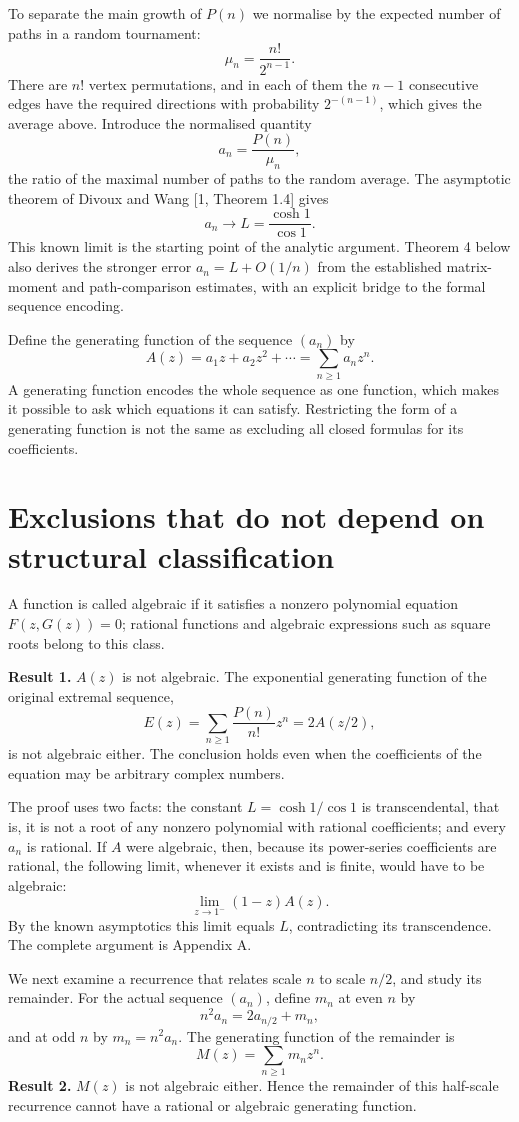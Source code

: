 \documentclass[11pt]{article}
\begin{document}
To separate the main growth of $P(n)$ we normalise by the expected number of paths in a random tournament:
\[
\mu_n=\frac{n!}{2^{n-1}}.
\]
There are $n!$ vertex permutations, and in each of them the $n-1$ consecutive edges have the required directions with probability $2^{-(n-1)}$, which gives the average above. Introduce the normalised quantity
\[
a_n=\frac{P(n)}{\mu_n},
\]
the ratio of the maximal number of paths to the random average. The asymptotic theorem of Divoux and Wang [1, Theorem 1.4] gives
\[
a_n\longrightarrow L=\frac{\cosh1}{\cos1}.
\]
This known limit is the starting point of the analytic argument. Theorem 4 below also derives the stronger error $a_n=L+O(1/n)$ from the established matrix-moment and path-comparison estimates, with an explicit bridge to the formal sequence encoding.

Define the generating function of the sequence $(a_n)$ by
\[
A(z)=a_1z+a_2z^2+\cdots=\sum_{n\ge1}a_nz^n.
\]
A generating function encodes the whole sequence as one function, which makes it possible to ask which equations it can satisfy. Restricting the form of a generating function is not the same as excluding all closed formulas for its coefficients.

\section{Exclusions that do not depend on structural classification}
A function is called algebraic if it satisfies a nonzero polynomial equation $F(z,G(z))=0$; rational functions and algebraic expressions such as square roots belong to this class.

\textbf{Result 1.} $A(z)$ is not algebraic. The exponential generating function of the original extremal sequence,
\[
E(z)=\sum_{n\ge1}\frac{P(n)}{n!}z^n=2A(z/2),
\]
is not algebraic either. The conclusion holds even when the coefficients of the equation may be arbitrary complex numbers.

The proof uses two facts: the constant $L=\cosh1/\cos1$ is transcendental, that is, it is not a root of any nonzero polynomial with rational coefficients; and every $a_n$ is rational. If $A$ were algebraic, then, because its power-series coefficients are rational, the following limit, whenever it exists and is finite, would have to be algebraic:
\[
\lim_{z\to1^-}(1-z)A(z).
\]
By the known asymptotics this limit equals $L$, contradicting its transcendence. The complete argument is Appendix A.

We next examine a recurrence that relates scale $n$ to scale $n/2$, and study its remainder. For the actual sequence $(a_n)$, define $m_n$ at even $n$ by
\[
n^2a_n=2a_{n/2}+m_n,
\]
and at odd $n$ by $m_n=n^2a_n$. The generating function of the remainder is
\[
M(z)=\sum_{n\ge1}m_nz^n.
\]
\textbf{Result 2.} $M(z)$ is not algebraic either. Hence the remainder of this half-scale recurrence cannot have a rational or algebraic generating function.
\end{document}
